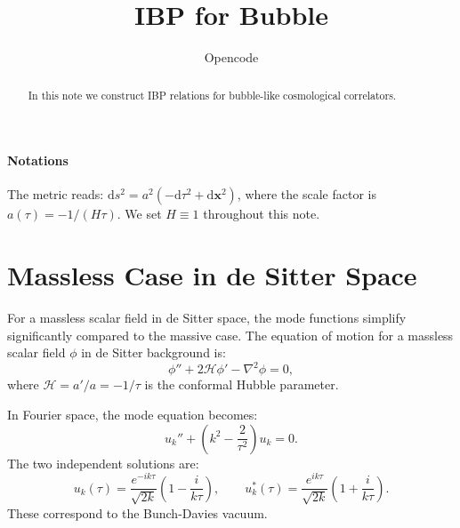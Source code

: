 \documentclass[a4paper,12pt]{article}
\def\bge{\begin{equation}}
\def\ede{\end{equation}}
\def\di{{\mathrm{d}}}
\def\mb{\mathbf}
\newcommand{\fnemail}[1]{\footnote{Email: \href{mailto:#1}{\nolinkurl{#1}}}}
\begin{document}
\title{\Large\textbf{IBP for Bubble\\[2mm]}}
\author{Opencode}

\date{}
\maketitle

\vspace{20mm}

\begin{abstract}
	In this note we construct IBP relations for bubble-like cosmological correlators.
	\vspace{10mm}
\end{abstract}

\newpage
\tableofcontents


\paragraph{Notations} The metric reads: $\di s^2=a^2(-\di\tau^2+\di \mb x^2)$, where the scale factor is $a(\tau) = -1/(H\tau)$. We set $H\equiv 1$ throughout this note.

\section{Massless Case in de Sitter Space}

For a massless scalar field in de Sitter space, the mode functions simplify significantly compared to the massive case. The equation of motion for a massless scalar field $\phi$ in de Sitter background is:
\bge
\phi'' + 2\mathcal{H}\phi' - \nabla^2\phi = 0,
\ede
where $\mathcal{H} = a'/a = -1/\tau$ is the conformal Hubble parameter.

In Fourier space, the mode equation becomes:
\bge
u_k'' + \left(k^2 - \frac{2}{\tau^2}\right)u_k = 0.
\ede
The two independent solutions are:
\bge
u_k(\tau) = \frac{e^{-ik\tau}}{\sqrt{2k}}\left(1 - \frac{i}{k\tau}\right), \qquad
u_k^*(\tau) = \frac{e^{ik\tau}}{\sqrt{2k}}\left(1 + \frac{i}{k\tau}\right).
\ede
These correspond to the Bunch-Davies vacuum.
\end{document}
